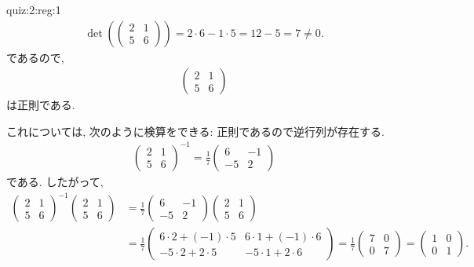 \begin{answerof}{quiz:2:reg:1}
  \begin{align*}
    \det(\begin{pmatrix}
      2&1\\5&6
    \end{pmatrix})=2\cdot 6 -1\cdot 5=12-5=7\neq 0.
  \end{align*}
  であるので,
  \begin{align*}
    \begin{pmatrix}
      2&1\\5&6
    \end{pmatrix}
  \end{align*}
  は正則である.

  これについては, 次のように検算をできる:
  正則であるので逆行列が存在する.
  \begin{align*}
     \begin{pmatrix}
      2&1\\5&6
     \end{pmatrix}^{-1}=
     \frac{1}{7}
     \begin{pmatrix}
      6&-1\\-5&2
    \end{pmatrix}
  \end{align*}
  である.
  したがって,
  \begin{align*}
     \begin{pmatrix}
      2&1\\5&6
     \end{pmatrix}^{-1}
     \begin{pmatrix}
      2&1\\5&6
    \end{pmatrix}
    & =
     \frac{1}{7}
     \begin{pmatrix}
      6&-1\\-5&2
    \end{pmatrix}
    \begin{pmatrix}
      2&1\\5&6
    \end{pmatrix}\\
   & =
    \frac{1}{7}
     \begin{pmatrix}
       6\cdot 2+(-1)\cdot 5&6\cdot 1+(-1)\cdot 6\\
       -5\cdot 2+2\cdot 5&-5\cdot 1+2\cdot 6
    \end{pmatrix}
    =
    \frac{1}{7}
     \begin{pmatrix}
       7&0\\
       0&7
    \end{pmatrix}
    =
     \begin{pmatrix}
       1&0\\
       0&1
    \end{pmatrix}.
  \end{align*}
  

\end{answerof}
